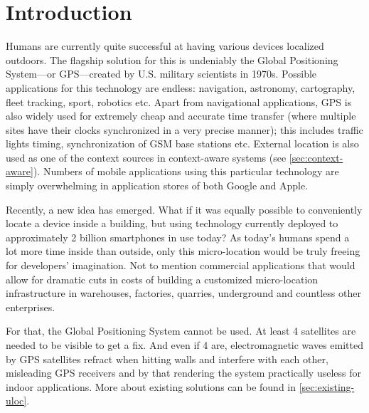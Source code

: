 \chapter{Introduction}
\label{cha:introduction}



Humans are currently quite successful at having various devices localized outdoors. The flagship solution for this is undeniably the Global Positioning System---or GPS---created by U.S. military scientists in 1970s. Possible applications for this technology are endless: navigation, astronomy, cartography, fleet tracking, sport, robotics etc. Apart from navigational applications, GPS is also widely used for extremely cheap and accurate time transfer (where multiple sites have their clocks synchronized in a very precise manner); this includes traffic lights timing, synchronization of GSM base stations etc. External location is also used as one of the context sources in context-aware systems (see \cref{sec:context-aware}). Numbers of mobile applications using this particular technology are simply overwhelming in application stores of both Google and Apple.

Recently, a new idea has emerged. What if it was equally possible to conveniently locate a device inside a building, but using technology currently deployed to approximately 2 billion smartphones in use today? As today's humans spend a lot more time inside than outside, only this micro-location would be truly freeing for developers' imagination. Not to mention commercial applications that would allow for dramatic cuts in costs of building a customized micro-location infrastructure in warehouses, factories, quarries, underground and countless other enterprises.


For that, the Global Positioning System cannot be used. At least 4 satellites are needed to be visible to get a fix. And even if 4 are, electromagnetic waves emitted by GPS satellites refract when hitting walls and interfere with each other, misleading GPS receivers and by that rendering the system practically useless for indoor applications. More about existing solutions can be found in \cref{sec:existing-uloc}.


